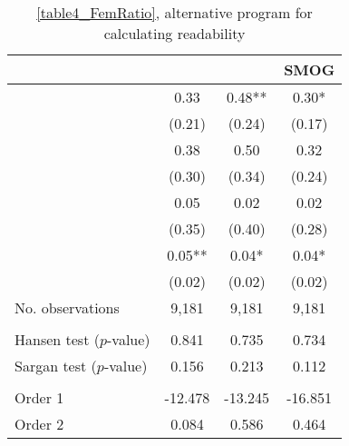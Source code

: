 \begin{table}
    \footnotesize
    \centering
    \begin{threeparttable}
        \caption{\autoref{table4_FemRatio}, alternative program for calculating readability}
        \label{table4_R}
        \begin{tabular}{p{4cm}S@{}S@{}S@{}}
            \toprule
            &{}&{}&{SMOG}\\
            \midrule
            &        0.33   &        0.48** &        0.30*  \\
                                          &      (0.21)   &      (0.24)   &      (0.17)   \\
            &        0.38   &        0.50   &        0.32   \\
                                          &      (0.30)   &      (0.34)   &      (0.24)   \\
            &        0.05   &        0.02   &        0.02   \\
                                          &      (0.35)   &      (0.40)   &      (0.28)   \\
            &        0.05** &        0.04*  &        0.04*  \\
                                          &      (0.02)   &      (0.02)   &      (0.02)   \\
            \midrule
            No. observations     &       9,181   &       9,181   &       9,181   \\
             \\
            \quad Hansen test (\(p\)-value)&       0.841   &       0.735   &       0.734   \\
            \quad Sargan test (\(p\)-value)&       0.156   &       0.213   &       0.112   \\
             \\
            \quad Order 1&     -12.478   &     -13.245   &     -16.851   \\
            \quad Order 2                 &       0.084   &       0.586   &       0.464   \\

\end{tabular}
\end{threeparttable}
\end{table}
